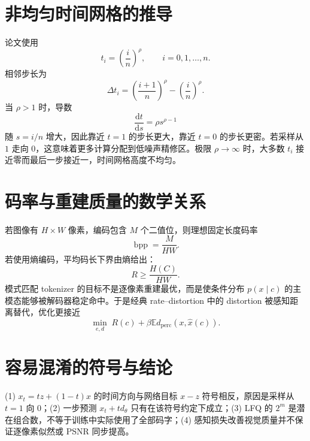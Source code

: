 \documentclass[UTF8,12pt,a4paper,fontset=none]{ctexart}
\numberwithin{equation}{section}
\newcommand{\E}{\mathbb{E}}
\newcommand{\dd}{\mathrm{d}}
\begin{document}
\section{非均匀时间网格的推导}
论文使用
\begin{equation}
 t_i=\left(\frac{i}{n}\right)^\rho,
 \qquad i=0,1,\ldots,n.
\end{equation}
相邻步长为
\begin{equation}
 \Delta t_i=\left(\frac{i+1}{n}\right)^\rho-\left(\frac{i}{n}\right)^\rho.
\end{equation}
当 $\rho>1$ 时，导数
\begin{equation}
 \frac{\dd t}{\dd s}=\rho s^{\rho-1}
\end{equation}
随 $s=i/n$ 增大，因此靠近 $t=1$ 的步长更大，靠近 $t=0$ 的步长更密。若采样从 $1$ 走向 $0$，这意味着更多计算分配到低噪声精修区。极限 $\rho\to\infty$ 时，大多数 $t_i$ 接近零而最后一步接近一，时间网格高度不均匀。

\section{码率与重建质量的数学关系}
若图像有 $H\times W$ 像素，编码包含 $M$ 个二值位，则理想固定长度码率
\begin{equation}
 \operatorname{bpp}=\frac{M}{HW}.
\end{equation}
若使用熵编码，平均码长下界由熵给出：
\begin{equation}
 R\ge \frac{H(C)}{HW}.
\end{equation}
模式匹配 tokenizer 的目标不是逐像素重建最优，而是使条件分布 $p(x\mid c)$ 的主模态能够被解码器稳定命中。于是经典 rate--distortion 中的 distortion 被感知距离替代，优化更接近
\begin{equation}
 \min_{e,d}\;R(c)+\beta\E d_{\mathrm{perc}}(x,\hat x(c)).
\end{equation}

\section{容易混淆的符号与结论}
\begin{criticalbox}[必须同时检查的四件事]
(1) $x_t=tz+(1-t)x$ 的时间方向与网络目标 $x-z$ 符号相反，原因是采样从 $t=1$ 向 $0$；(2) 一步预测 $x_t+t d_\theta$ 只有在该符号约定下成立；(3) LFQ 的 $2^m$ 是潜在组合数，不等于训练中实际使用了全部码字；(4) 感知损失改善视觉质量并不保证逐像素似然或 PSNR 同步提高。
\end{criticalbox}
\end{document}
